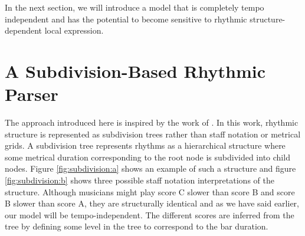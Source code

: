 In the next section, we will introduce a model that is completely tempo independent and has the potential to become sensitive to rhythmic structure-dependent local expression.

\section{A Subdivision-Based Rhythmic Parser}
\label{sec:introducing}



The approach introduced here is inspired by the work of \citet{longuet1976perception}. In this work, rhythmic structure is represented as subdivision trees rather than staff notation or metrical grids. A subdivision tree represents rhythms as a hierarchical structure where some metrical duration corresponding to the root node is subdivided into child nodes. Figure \ref{fig:subdivision:a} shows an example of such a structure and figure \ref{fig:subdivision:b} shows three possible staff notation interpretations of the structure. Although musicians might play score C slower than score B and score B slower than score A, they are structurally identical and as we have said earlier, our model will be tempo-independent. The different scores are inferred from the tree by defining some level in the tree to correspond to the bar duration.


